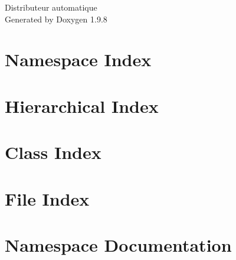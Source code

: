\documentclass[twoside]{book}
\newcommand{\+}{\discretionary{\mbox{\scriptsize$\hookleftarrow$}}{}{}}
\newcommand{\clearemptydoublepage}{%
    \newpage{\pagestyle{empty}\cleardoublepage}%
  }
\begin{document}
  \raggedbottom
    \hypersetup{pageanchor=false,
                bookmarksnumbered=true,
                pdfencoding=unicode
               }
  \begin{titlepage}
  \vspace*{7cm}
  \begin{center}%
  {\Large Distributeur automatique}\\
  \vspace*{1cm}
  {\large Generated by Doxygen 1.9.8}\\
  \end{center}
  \end{titlepage}
  \clearemptydoublepage
  \tableofcontents
  \clearemptydoublepage
  \hypersetup{pageanchor=true}
\chapter{Namespace Index}

\chapter{Hierarchical Index}

\chapter{Class Index}

\chapter{File Index}

\chapter{Namespace Documentation}














\end{document}
